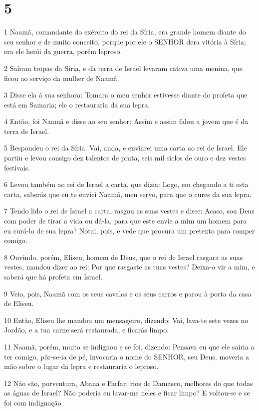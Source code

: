 \chapter{5}

\par 1 Naamã, comandante do exército do rei da Síria, era grande homem diante do seu senhor e de muito conceito, porque por ele o SENHOR dera vitória à Síria; era ele herói da guerra, porém leproso.
\par 2 Saíram tropas da Síria, e da terra de Israel levaram cativa uma menina, que ficou ao serviço da mulher de Naamã.
\par 3 Disse ela à sua senhora: Tomara o meu senhor estivesse diante do profeta que está em Samaria; ele o restauraria da sua lepra.
\par 4 Então, foi Naamã e disse ao seu senhor: Assim e assim falou a jovem que é da terra de Israel.
\par 5 Respondeu o rei da Síria: Vai, anda, e enviarei uma carta ao rei de Israel. Ele partiu e levou consigo dez talentos de prata, seis mil siclos de ouro e dez vestes festivais.
\par 6 Levou também ao rei de Israel a carta, que dizia: Logo, em chegando a ti esta carta, saberás que eu te enviei Naamã, meu servo, para que o cures da sua lepra.
\par 7 Tendo lido o rei de Israel a carta, rasgou as suas vestes e disse: Acaso, sou Deus com poder de tirar a vida ou dá-la, para que este envie a mim um homem para eu curá-lo de sua lepra? Notai, pois, e vede que procura um pretexto para romper comigo.
\par 8 Ouvindo, porém, Eliseu, homem de Deus, que o rei de Israel rasgara as suas vestes, mandou dizer ao rei: Por que rasgaste as tuas vestes? Deixa-o vir a mim, e saberá que há profeta em Israel.
\par 9 Veio, pois, Naamã com os seus cavalos e os seus carros e parou à porta da casa de Eliseu.
\par 10 Então, Eliseu lhe mandou um mensageiro, dizendo: Vai, lava-te sete vezes no Jordão, e a tua carne será restaurada, e ficarás limpo.
\par 11 Naamã, porém, muito se indignou e se foi, dizendo: Pensava eu que ele sairia a ter comigo, pôr-se-ia de pé, invocaria o nome do SENHOR, seu Deus, moveria a mão sobre o lugar da lepra e restauraria o leproso.
\par 12 Não são, porventura, Abana e Farfar, rios de Damasco, melhores do que todas as águas de Israel? Não poderia eu lavar-me neles e ficar limpo? E voltou-se e se foi com indignação.
